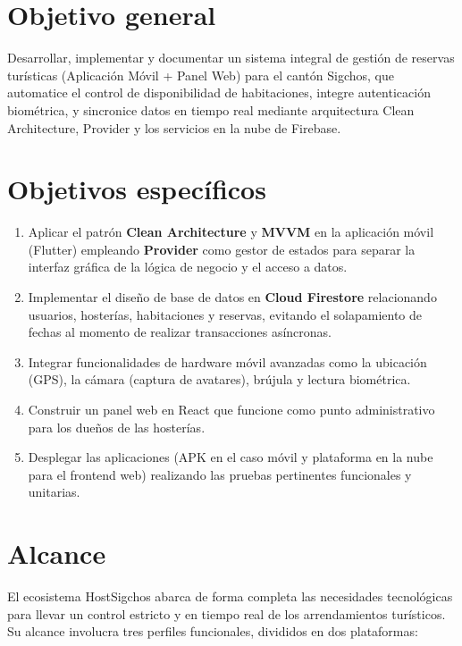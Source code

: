 \documentclass[12pt,letterpaper]{report}
\newcommand{\tech}[1]{\textbf{#1}}
\begin{document}
\section{Objetivo general}
Desarrollar, implementar y documentar un sistema integral de gestión de reservas turísticas (Aplicación Móvil + Panel Web) para el cantón Sigchos, que automatice el control de disponibilidad de habitaciones, integre autenticación biométrica, y sincronice datos en tiempo real mediante arquitectura Clean Architecture, Provider y los servicios en la nube de Firebase.

\section{Objetivos específicos}
\begin{enumerate}[label=\textbf{OE\arabic*.}]
  \item Aplicar el patrón \tech{Clean Architecture} y \tech{MVVM} en la aplicación móvil (Flutter) empleando \tech{Provider} como gestor de estados para separar la interfaz gráfica de la lógica de negocio y el acceso a datos.
  \item Implementar el diseño de base de datos en \tech{Cloud Firestore} relacionando usuarios, hosterías, habitaciones y reservas, evitando el solapamiento de fechas al momento de realizar transacciones asíncronas.
  \item Integrar funcionalidades de hardware móvil avanzadas como la ubicación (GPS), la cámara (captura de avatares), brújula y lectura biométrica.
  \item Construir un panel web en React que funcione como punto administrativo para los dueños de las hosterías.
  \item Desplegar las aplicaciones (APK en el caso móvil y plataforma en la nube para el frontend web) realizando las pruebas pertinentes funcionales y unitarias.
\end{enumerate}

\section{Alcance}
El ecosistema HostSigchos abarca de forma completa las necesidades tecnológicas para llevar un control estricto y en tiempo real de los arrendamientos turísticos. Su alcance involucra tres perfiles funcionales, divididos en dos plataformas:
\end{document}
